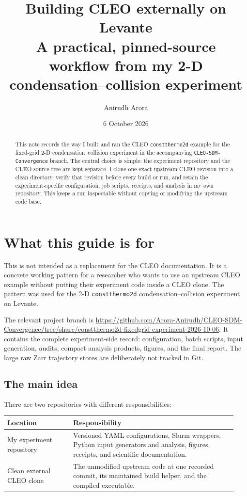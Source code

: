 \documentclass[11pt,a4paper]{article}
\title{\vspace{-1.5em}\textbf{Building CLEO externally on Levante}\\[0.4em]
\large A practical, pinned-source workflow from my 2-D condensation--collision experiment}
\author{Anirudh Arora}
\date{6 October 2026}
\begin{document}
\maketitle
\thispagestyle{fancy}

\begin{abstract}
This note records the way I built and ran the CLEO \texttt{constthermo2d} example for the fixed-grid 2-D condensation--collision experiment in the accompanying \texttt{CLEO-SDM-Convergence} branch. The central choice is simple: the experiment repository and the CLEO source tree are kept separate. I clone one exact upstream CLEO revision into a clean directory, verify that revision before every build or run, and retain the experiment-specific configuration, job scripts, receipts, and analysis in my own repository. This keeps a run inspectable without copying or modifying the upstream code base.
\end{abstract}

\tableofcontents
\newpage

\section{What this guide is for}

This is not intended as a replacement for the CLEO documentation. It is a concrete working pattern for a researcher who wants to use an upstream CLEO example without putting their experiment code inside a CLEO clone. The pattern was used for the 2-D \texttt{constthermo2d} condensation--collision experiment on Levante.

The relevant project branch is
\url{https://github.com/Arora-Anirudh/CLEO-SDM-Convergence/tree/share/constthermo2d-fixedgrid-experiment-2026-10-06}.
It contains the complete experiment-side record: configuration, batch scripts, input generation, audits, compact analysis products, figures, and the final report. The large raw Zarr trajectory stores are deliberately not tracked in Git.

\subsection{The main idea}

There are two repositories with different responsibilities:

\begin{longtable}{@{}p{0.27\linewidth}p{0.67\linewidth}@{}}
\toprule
Location & Responsibility \\
\midrule
\endhead
My experiment repository & Versioned YAML configurations, Slurm wrappers, Python input generators and analysis, figures, receipts, and scientific documentation. \\
Clean external CLEO clone & The unmodified upstream code at one recorded commit, its maintained build helper, and the compiled executable. \\
\bottomrule
\end{longtable}
\end{document}
